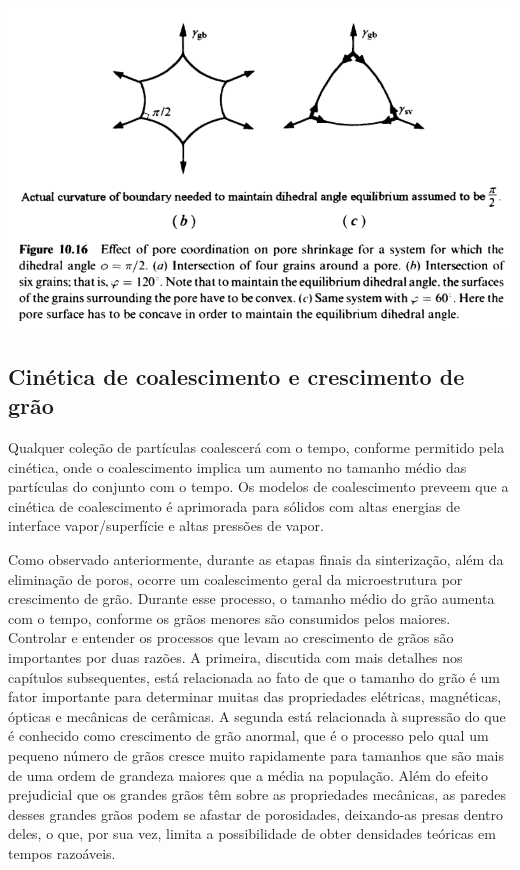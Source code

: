 \includegraphics*[width=\linewidth]{./images/eliminacao_poros_diedro.png}

\subsection*{Cinética de coalescimento e crescimento de grão}

Qualquer coleção de partículas coalescerá com o tempo, conforme permitido pela cinética, onde o coalescimento implica um aumento no tamanho médio das partículas do conjunto com o tempo. Os modelos de coalescimento preveem que a cinética de coalescimento é aprimorada para sólidos com altas energias de interface vapor/superfície e altas pressões de vapor.

Como observado anteriormente, durante as etapas finais da sinterização, além da eliminação de poros, ocorre um coalescimento geral da microestrutura por crescimento de grão. Durante esse processo, o tamanho médio do grão aumenta com o tempo, conforme os grãos menores são consumidos pelos maiores. Controlar e entender os processos que levam ao crescimento de grãos são importantes por duas razões. A primeira, discutida com mais detalhes nos capítulos subsequentes, está relacionada ao fato de que o tamanho do grão é um fator importante para determinar muitas das propriedades elétricas, magnéticas, ópticas e mecânicas de cerâmicas. A segunda está relacionada à supressão do que é conhecido como crescimento de grão anormal, que é o processo pelo qual um pequeno número de grãos cresce muito rapidamente para tamanhos que são mais de uma ordem de grandeza maiores que a média na população. Além do efeito prejudicial que os grandes grãos têm sobre as propriedades mecânicas, as paredes desses grandes grãos podem se afastar de porosidades, deixando-as presas dentro deles, o que, por sua vez, limita a possibilidade de obter densidades teóricas em tempos razoáveis.

